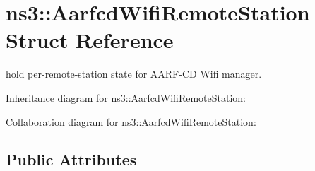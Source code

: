 \hypertarget{structns3_1_1AarfcdWifiRemoteStation}{}\section{ns3\+:\+:Aarfcd\+Wifi\+Remote\+Station Struct Reference}
\label{structns3_1_1AarfcdWifiRemoteStation}


hold per-\/remote-\/station state for A\+A\+R\+F-\/\+CD Wifi manager.  




Inheritance diagram for ns3\+:\+:Aarfcd\+Wifi\+Remote\+Station\+:


Collaboration diagram for ns3\+:\+:Aarfcd\+Wifi\+Remote\+Station\+:
\subsection*{Public Attributes}

